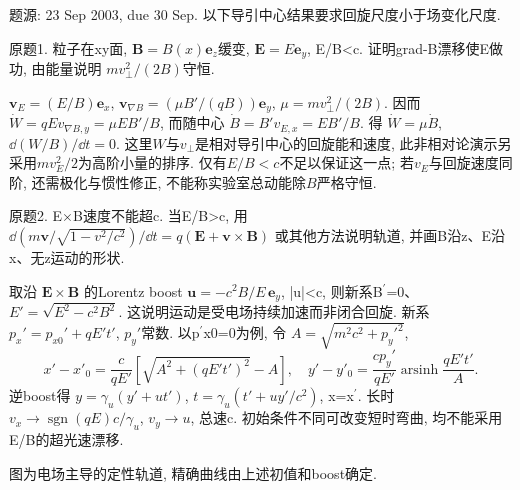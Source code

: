 题源: 23 Sep 2003, due 30 Sep. 以下导引中心结果要求回旋尺度小于场变化尺度.
\begin{exercise}\label{ex:03-3-1}
原题1. 粒子在xy面, $\mathbf B=B(x)\mathbf e_z$缓变, $\mathbf E=E\mathbf e_y$, E/B<c. 证明grad-B漂移使E做功, 由能量说明 $mv_\perp^2/(2B)$守恒.
\end{exercise}
\begin{solution}
$\mathbf v_E=(E/B)\mathbf e_x$, $\mathbf v_{\nabla B}=(\mu B'/(qB))\mathbf e_y$, $\mu=mv_\perp^2/(2B)$. 因而 $\dot W=qE v_{\nabla B,y}=\mu EB'/B$, 而随中心 $\dot B=B'v_{E,x}=EB'/B$. 得 $\dot W=\mu\dot B$, $\dd(W/B)/\dd t=0$. 这里$W$与$v_\perp$是相对导引中心的回旋能和速度, 此非相对论演示另采用$mv_E^2/2$为高阶小量的排序. 仅有$E/B<c$不足以保证这一点; 若$v_E$与回旋速度同阶, 还需极化与惯性修正, 不能称实验室总动能除$B$严格守恒.
\end{solution}
\begin{exercise}\label{ex:03-3-2}
原题2. E\ensuremath{\times}B速度不能超c. 当E/B>c, 用 $\dd(m\mathbf v/\sqrt{1-v^2/c^2})/\dd t=q(\mathbf E+\mathbf v\times\mathbf B)$ 或其他方法说明轨道, 并画B沿z、E沿x、无z运动的形状.
\end{exercise}
\begin{solution}
取沿 $\mathbf E\times\mathbf B$ 的Lorentz boost $\mathbf u=-c^2B/E\,\mathbf e_y$, |u|<c, 则新系B\ensuremath{{}^{\prime}}=0、$E'=\sqrt{E^2-c^2B^2}$. 这说明运动是受电场持续加速而非闭合回旋. 新系 $p_x'=p_{x0}'+qE't'$, $p_y'$常数. 以p\ensuremath{{}^{\prime}}x0=0为例, 令 $A=\sqrt{m^2c^2+p_y'^2}$,
\begin{equation}
 x'-x'_0=\frac c{qE'}[\sqrt{A^2+(qE't')^2}-A],\quad
 y'-y'_0=\frac{cp_y'}{qE'}\operatorname{arsinh}\frac{qE't'}A.
\end{equation}
逆boost得 $y=\gamma_u(y'+ut')$, $t=\gamma_u(t'+uy'/c^2)$, x=x\ensuremath{{}^{\prime}}. 长时 $v_x\to\operatorname{sgn}(qE)c/\gamma_u$, $v_y\to u$, 总速c. 初始条件不同可改变短时弯曲, 均不能采用E/B的超光速漂移.
\begin{center}\end{center}
图为电场主导的定性轨道, 精确曲线由上述初值和boost确定.
\end{solution}
